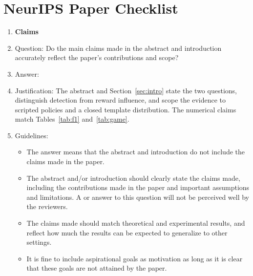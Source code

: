 \section*{NeurIPS Paper Checklist}

\begin{enumerate}

\item {\bf Claims}
    \item[] Question: Do the main claims made in the abstract and introduction accurately reflect the paper's contributions and scope?
    \item[] Answer: \answerYes{}
    \item[] Justification: The abstract and Section~\ref{sec:intro} state the two questions, distinguish detection from reward influence, and scope the evidence to scripted policies and a closed template distribution. The numerical claims match Tables~\ref{tab:f1} and~\ref{tab:game}.
    \item[] Guidelines:
    \begin{itemize}
        \item The answer \answerNA{} means that the abstract and introduction do not include the claims made in the paper.
        \item The abstract and/or introduction should clearly state the claims made, including the contributions made in the paper and important assumptions and limitations. A \answerNo{} or \answerNA{} answer to this question will not be perceived well by the reviewers.
        \item The claims made should match theoretical and experimental results, and reflect how much the results can be expected to generalize to other settings.
        \item It is fine to include aspirational goals as motivation as long as it is clear that these goals are not attained by the paper.
    \end{itemize}


\end{enumerate}
